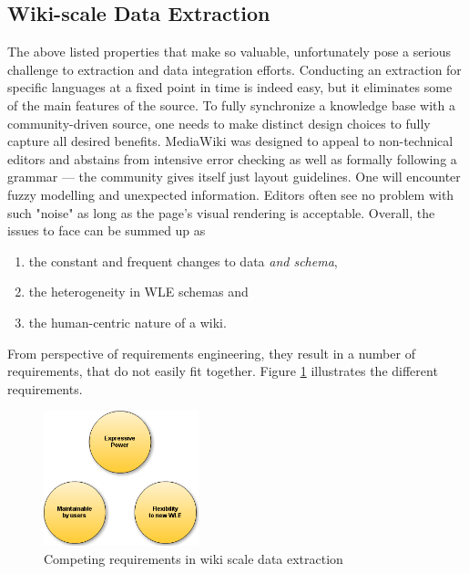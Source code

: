 \subsection{Wiki-scale Data Extraction}
The above listed properties that make \wik so valuable, unfortunately pose a serious challenge to extraction and data integration efforts. 
Conducting an extraction for specific languages at a fixed point in time is indeed easy, but it eliminates some of the main features of the source. 
To fully synchronize a knowledge base with a community-driven source, one needs to make distinct design choices to fully capture all desired benefits.
MediaWiki was designed to appeal to non-technical editors and abstains from intensive error checking as well as formally following a grammar --- the community gives itself just layout guidelines. 
One will encounter fuzzy modelling and unexpected information. 
Editors often see no problem with such "noise" as long as the page's visual rendering is acceptable.  
Overall, the issues to face can be summed up as 
\begin{enumerate}
\item the constant and frequent changes to data \textit{and schema},
\item the heterogeneity in WLE schemas and
\item the human-centric nature of a wiki.
\end{enumerate}  
From perspective of requirements engineering, they result in a number of requirements, that do not easily fit together. Figure \ref{fig:requirements} illustrates the different requirements.

\begin{figure}[htb]
\centering
\includegraphics[width=0.4\textwidth]{../images/requirements}
\caption{Competing requirements in wiki scale data extraction}
\label{fig:requirements}
\end{figure}

